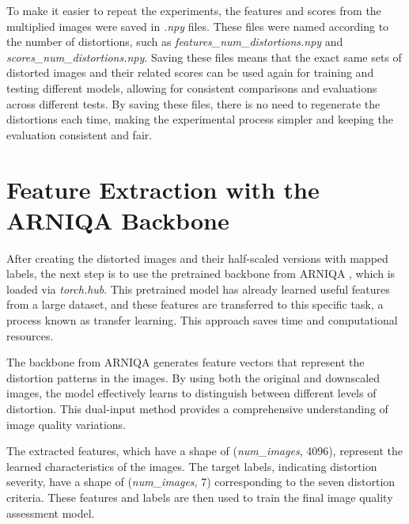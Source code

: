 \vspace{\baselineskip}
\noindent
To make it easier to repeat the experiments, the features and scores from the multiplied images were saved in \textit{.npy} files. These files were named according to the number of distortions, such as \textit{features\_num\_distortions.npy} and \textit{scores\_num\_distortions.npy}. Saving these files means that the exact same sets of distorted images and their related scores can be used again for training and testing different models, allowing for consistent comparisons and evaluations across different tests. By saving these files, there is no need to regenerate the distortions each time, making the experimental process simpler and keeping the evaluation consistent and fair. \par

\clearpage
\section{Feature Extraction with the ARNIQA Backbone}
\label{sec:FeatureExtraction}
After creating the distorted images and their half-scaled versions with mapped labels, the next step is to use the pretrained backbone from ARNIQA \autocite{ARNIQA}, which is loaded via \textit{torch.hub}. This pretrained model has already learned useful features from a large dataset, and these features are transferred to this specific task, a process known as transfer learning. This approach saves time and computational resources. \par
\vspace{\baselineskip}
\noindent
The backbone from ARNIQA generates feature vectors that represent the distortion patterns in the images. By using both the original and downscaled images, the model effectively learns to distinguish between different levels of distortion. This dual-input method provides a comprehensive understanding of image quality variations. \par
\vspace{\baselineskip}
\noindent
The extracted features, which have a shape of (\textit{num\_images}, 4096), represent the learned characteristics of the images. The target labels, indicating distortion severity, have a shape of (\textit{num\_images}, 7) corresponding to the seven distortion criteria. These features and labels are then used to train the final image quality assessment model. \par

